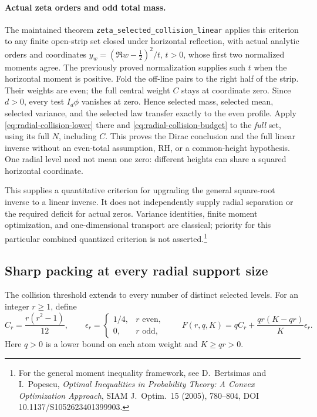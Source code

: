 \paragraph{Actual zeta orders and odd total mass.}
The maintained theorem \texttt{zeta\_selected\_collision\_linear}
applies this criterion to any finite open-strip set closed under
horizontal reflection, with actual analytic orders and coordinates
\(y_w=(\Re w-\tfrac12)^2/t\), \(t>0\), whose first two normalized
moments agree.  The previously proved normalization supplies such
\(t\) when the horizontal moment is positive.
Fold the off-line pairs to the right half of the strip.  Their
weights are even; the full central weight \(C\) stays at coordinate
zero.  Since \(d>0\), every test \(I_d\phi\) vanishes at zero.
Hence selected mass, selected mean, selected variance, and the
selected law transfer exactly to the even profile.  Apply
\eqref{eq:radial-collision-lower} there and
\eqref{eq:radial-collision-budget} to the \emph{full} set, using its
full \(N\), including \(C\).  This proves the Dirac conclusion and
the full linear inverse without an even-total assumption, RH, or
a common-height hypothesis.  One radial level need not mean one
zero: different heights can share a squared horizontal coordinate.

This supplies a quantitative criterion for upgrading the general
square-root inverse to a linear inverse.  It does not independently
supply radial separation or the required deficit for actual zeros.
Variance identities, finite moment optimization, and one-dimensional
transport are classical; priority for this particular combined
quantized criterion is not asserted.\footnote{For the general moment
inequality framework, see D.~Bertsimas and I.~Popescu,
\emph{Optimal Inequalities in Probability Theory: A Convex Optimization
Approach}, SIAM J.~Optim.~15 (2005), 780--804,
DOI 10.1137/S1052623401399903.}

\subsection{Sharp packing at every radial support size}
\label{subsec:all-r-radial-packing}

The collision threshold extends to every number of distinct selected levels.
For an integer \(r\ge1\), define
\[
 C_r=\frac{r(r^2-1)}{12},\qquad
 \epsilon_r=\begin{cases}1/4,&r\text{ even},\\0,&r\text{ odd},\end{cases}
 \qquad
 F(r,q,K)=qC_r+\frac{qr(K-qr)}K\epsilon_r.
 \tag{RP1}\label{eq:all-r-variance-floor}
\]
Here \(q>0\) is a lower bound on each atom weight and \(K\ge qr>0\).

